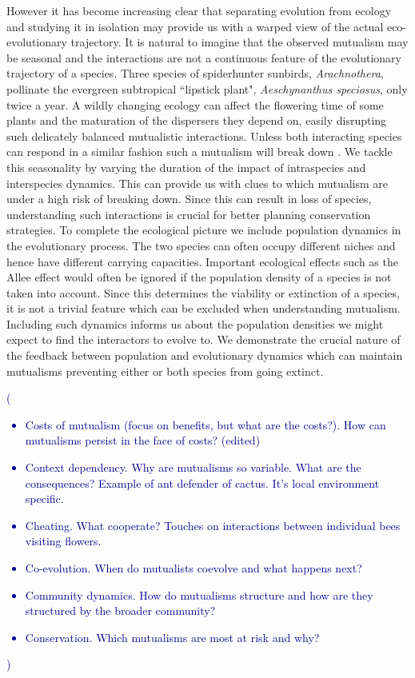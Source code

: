 \documentclass[12pt]{article}
\newcommand{\cha}[1]{\textcolor{darkblue}{(#1)}}
\begin{document}
However it has become increasing clear that separating evolution from ecology and studying it in isolation may provide us with a warped view of the actual eco-evolutionary trajectory.
It is natural to imagine that the observed mutualism may be seasonal and the interactions are not a continuous feature of the evolutionary trajectory of a species. 
Three species of spiderhunter sunbirds, \textit{Arachnothera}, pollinate the evergreen subtropical ``lipstick plant", \textit{Aeschynanthus speciosus}, only twice a year.
A wildly changing ecology can affect the flowering time of some plants and the maturation of the dispersers they depend on, easily disrupting such delicately balanced mutualistic interactions. 
Unless both interacting species can respond in a similar fashion such a mutualism will break down \citep{warren:GCB:2014}.
We tackle this seasonality by varying the duration of the impact of intraspecies and interspecies dynamics.
This can provide us with clues to which mutualism are under a high risk of breaking down.
Since this can result in loss of species, understanding such interactions is crucial for better planning conservation strategies.
To complete the ecological picture we include population dynamics in the evolutionary process.
The two species can often occupy different niches and hence have different carrying capacities.
Important ecological effects such as the Allee effect would often be ignored if the population density of a species is not taken into account.
Since this determines the viability or extinction of a species, it is not a trivial feature which can be excluded when understanding mutualism.
Including such dynamics informs us about the population densities we might expect to find the interactors to evolve to.
We demonstrate the crucial nature of the feedback between population and evolutionary dynamics which can maintain mutualisms preventing either or both species from going extinct.


\cha{
\begin{itemize}
\item Costs of mutualism (focus on benefits, but what are the costs?).  How can mutualisms persist in the face of costs? (edited)
\item Context dependency.  Why are mutualisms so variable.  What are the consequences?  Example of ant defender of cactus.  It’s local environment specific.
\item Cheating. What cooperate?  Touches on interactions between individual bees visiting flowers.
\item Co-evolution.  When do mutualists coevolve and what happens next?
\item Community dynamics.  How do mutualisms structure and how are they structured by the broader community?
\item Conservation.  Which mutualisms are most at risk and why?
\end{itemize}
}
\end{document}

